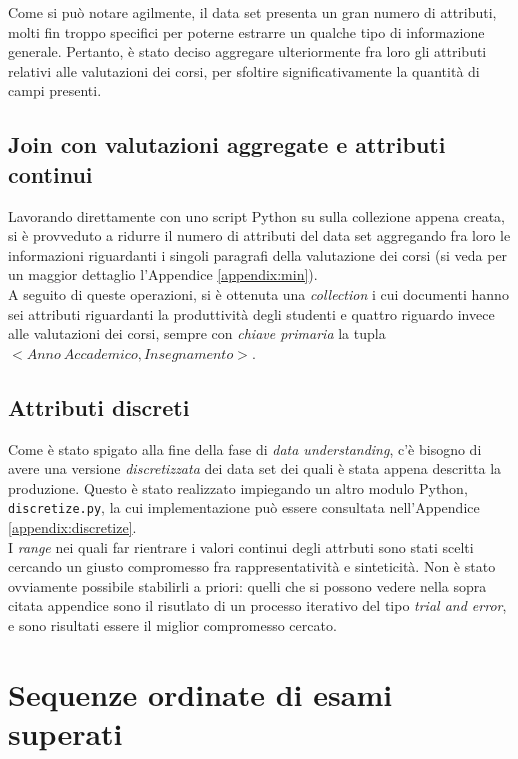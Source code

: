 		Come si può notare agilmente, il data set presenta un gran numero di attributi, molti fin troppo specifici per poterne estrarre un qualche tipo di informazione generale. Pertanto, è stato deciso aggregare ulteriormente fra loro gli attributi relativi alle valutazioni dei corsi, per sfoltire significativamente la quantità di campi presenti.
		
	\subsection{Join con valutazioni aggregate e attributi continui}

		Lavorando direttamente con uno script Python su sulla collezione appena creata, si è provveduto a ridurre il numero di attributi del data set aggregando fra loro le informazioni riguardanti i singoli paragrafi della valutazione dei corsi (si veda per un maggior dettaglio l'Appendice \ref{appendix:min}). \\

		A seguito di queste operazioni, si è ottenuta una \textit{collection} i cui documenti hanno sei attributi riguardanti la produttività degli studenti e quattro riguardo invece alle valutazioni dei corsi, sempre con \textit{chiave primaria} la tupla $< Anno \ Accademico, Insegnamento >$.
	
	\subsection{Attributi discreti}

		Come è stato spigato alla fine della fase di \textit{data understanding}, c'è bisogno di avere una versione \textit{discretizzata} dei data set dei quali è stata appena descritta la produzione. Questo è stato realizzato impiegando un altro modulo Python, \texttt{discretize.py}, la cui implementazione può essere consultata nell'Appendice \ref{appendix:discretize}. \\

		I \textit{range} nei quali far rientrare i valori continui degli attrbuti sono stati scelti cercando un giusto compromesso fra rappresentatività e sinteticità. Non è stato ovviamente possibile stabilirli a priori: quelli che si possono vedere nella sopra citata appendice sono il risutlato di un processo iterativo del tipo \textit{trial and error}, e sono risultati essere il miglior compromesso cercato.

\section{Sequenze ordinate di esami superati}

